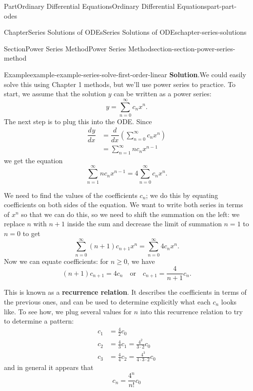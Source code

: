 \documentclass[twoside,10pt,]{book}
\newcommand{\blocktitlefont}{\relax}
\newcommand{\terminology}[1]{\textbf{#1}}
\numberwithin{equation}{part}
\newcommand{\dv}[3][]{\dfrac{d^{#1} #2}{d #3^{#1}}}
\newcommand{\parens}[1]{\left( #1 \right)}
\newcommand{\qq}[1]{\quad\text{#1}\quad}
\begin{document}
\begin{partptx}{Part}{Ordinary Differential Equations}{}{Ordinary Differential Equations}{}{}{part-part-odes}
\begin{chapterptx}{Chapter}{Series Solutions of ODEs}{}{Series Solutions of ODEs}{}{}{chapter-series-solutions}
\begin{sectionptx}{Section}{Power Series Method}{}{Power Series Method}{}{}{section-section-power-series-method}
\begin{example}{Example}{}{example-example-series-solve-first-order-linear}
\noindent\textbf{\blocktitlefont Solution}.\hypertarget{solution-example-series-solve-first-order-linear-b}{}\quad{}We could easily solve this using Chapter 1 methods, but we'll use power series to practice. To start, we assume that the solution \(y\) can be written as a power series:%
\begin{equation*}
y = \sum_{n=0}^{\infty}c_{n}x^{n}.
\end{equation*}
The next step is to plug this into the ODE. Since%
\begin{align*}
\dv{y}{x} &= \dv{}{x}\parens{\sum_{n=0}^{\infty}c_{n}x^{n}}\\
&= \sum_{n=1}^{\infty}nc_{n}x^{n-1}
\end{align*}
we get the equation%
\begin{equation*}
\sum_{n=1}^{\infty}nc_{n}x^{n-1} = 4\sum_{n=0}^{\infty}c_{n}x^{n}\text{.}
\end{equation*}
%
\par
We need to find the values of the coefficients \(c_{n}\); we do this by equating coefficients on both sides of the equation. We want to write both series in terms of \(x^{n}\) so that we can do this, so we need to shift the summation on the left: we replace \(n\) with \(n+1\) inside the sum and decrease the limit of summation \(n=1\) to \(n=0\) to get%
\begin{equation*}
\sum_{n=0}^{\infty}(n+1)c_{n+1}x^{n} = \sum_{n=0}^{\infty}4c_{n}x^{n}\text{.}
\end{equation*}
Now we can equate coefficients: for \(n\geq0\), we have%
\begin{equation*}
(n+1)c_{n+1} = 4c_{n}\qq{or} c_{n+1} = \frac{4}{n+1}c_{n}.
\end{equation*}
%
\par
This is known as a \terminology{recurrence relation}. It describes the coefficients in terms of the previous ones, and can be used to determine explicitly what each \(c_{n}\) looks like. To see how, we plug several values for \(n\) into this recurrence relation to try to determine a pattern:%
\begin{align*}
c_{1} &= \frac{4}{2}c_{0}\\
c_{2} &= \frac{4}{3}c_{1} = \frac{4^{2}}{3\cdot2}c_{0}\\
c_{3} &= \frac{4}{4}c_{2} = \frac{4^{3}}{4\cdot3\cdot2}c_{0}
\end{align*}
and in general it appears that%
\begin{equation*}
c_{n} = \frac{4^{n}}{n!}c_{0}
\end{equation*}

\end{example}
\end{sectionptx}
\end{chapterptx}
\end{partptx}
\end{document}
